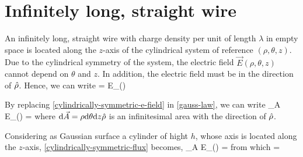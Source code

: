 \section{Infinitely long, straight wire}
An infinitely long, straight wire with charge density per unit of length $\lambda$ in empty space is located along the $z$-axis of the 
cylindrical system of reference $(\rho, \theta, z)$. Due to the cylindrical symmetry of the system, the electric field
$\vec{E}(\rho,\theta,z)$ cannot depend on $\theta$ and $z$. In addition, the electric field must be in the direction of $\hat{\rho}$. 
Hence, we can write
\be\label{cylindrically-symmetric-e-field}
 = E_{\rho}(\rho)\uvec{\rho}
\ee

By replacing \ref{cylindrically-symmetric-e-field} in \ref{gauss-law}, we can write
\be\label{cylindrically-symmetric-flux}
\oiint_A E_{\rho}(\rho) \cdot \uvec{\rho} \cdot {} =
\ee
where $\mathrm{d}\vec{A} =  \rho\mathrm{d}\theta \mathrm{d}z\hat{\rho}$ is an infinitesimal area with the direction of $\hat{\rho}$.

Considering as Gaussian surface a cylinder of hight $h$, whose axis is located along the $z$-axis, \ref{cylindrically-symmetric-flux} becomes,
\be\label{cylindrically-symmetric-flux-2}
\oiint_A E_{\rho}(\rho) \uvec{\rho}\cdot\uvec{\rho} \rho \total{\theta}=
\ee
from which
\be
{}=\uvec{\rho}
\ee
